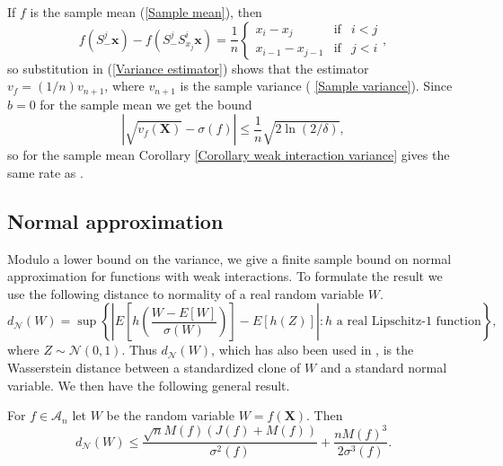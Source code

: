 \documentclass[final,12pt]{colt2018} %
\begin{document}
		If $f$ is the sample mean (\ref{Sample mean}), then 
		\begin{equation*}
		f\left( S_{-}^{j}\mathbf{x}\right) -f\left( S_{-}^{j}S_{x_{j}}^{i}\mathbf{x}%
		\right) =\frac{1}{n}\left\{ 
		\begin{array}{ccc}
		x_{i}-x_{j} & \text{if} & i<j \\ 
		x_{i-1}-x_{j-1} & \text{if} & j<i%
		\end{array}%
		\right. , 
		\end{equation*}%
		so substitution in (\ref{Variance estimator}) shows that the estimator $%
		v_{f}=\left( 1/n\right) v_{n+1}$, where $v_{n+1}$ is the sample variance (%
		\ref{Sample variance}). Since $b=0$ for the sample mean we get the bound%
		\begin{equation*}
		\left\vert \sqrt{v_{f}\left( \mathbf{X}\right) }-\sigma \left( f\right)
		\right\vert \leq \frac{1}{n}\sqrt{2\ln \left( 2/\delta \right) }, 
		\end{equation*}%
		so for the sample mean Corollary \ref{Corollary weak interaction variance}
		gives the same rate as \citep{Maurer 2009}.
		
		\subsection{Normal approximation\label{Subsection Normal Approximation}}
		
		Modulo a lower bound on the variance, we give a finite sample bound on
		normal approximation for functions with weak interactions. To formulate the
		result we use the following distance to normality of a real random variable $%
		W.$%
		\begin{equation*}
		d_{\mathcal{N}}\left( W\right) =\sup \left\{ \left\vert E\left[ h\left( 
		\frac{W-E\left[ W\right] }{\sigma \left( W\right) }\right) \right] -E\left[
		h\left( Z\right) \right] \right\vert :h\text{ a real Lipschitz-1 function}%
		\right\} , 
		\end{equation*}%
		where $Z\sim \mathcal{N}\left( 0,1\right) $. Thus $d_{\mathcal{N}}\left(
		W\right) $, which has also been used in \cite{Chatterjee 2008}, is the
		Wasserstein distance between a standardized clone of $W$ and a standard
		normal variable. We then have the following general result.
		
		\begin{theorem}
			\label{Theorem normal}For $f\in \mathcal{A}_{n}$ let $W$ be the random variable $W= f\left( \mathbf{X}\right)$. Then 
			\begin{equation*}
			d_{\mathcal{N}}\left( W \right) \leq \frac{\sqrt{n}%
				M\left( f\right) \left( J\left( f\right) +M\left( f\right) \right) }{\sigma
				^{2}\left( f\right) }+\frac{nM\left( f\right) ^{3}}{2\sigma ^{3}\left(
				f\right) }. 
			\end{equation*}
		\end{theorem}
		
\end{document}
